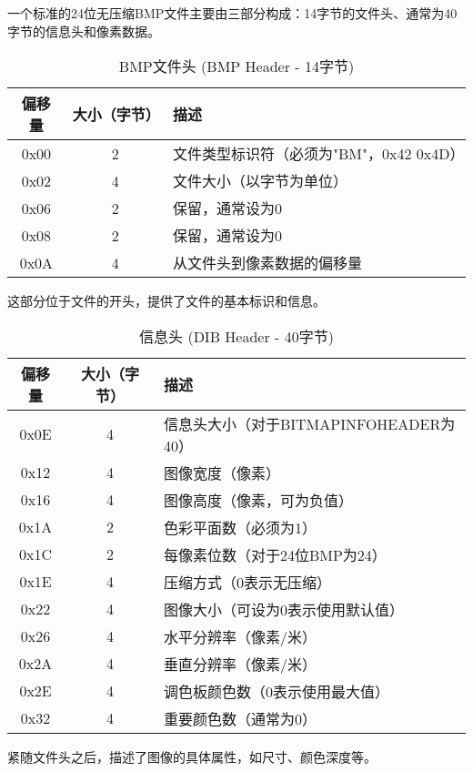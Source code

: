 \documentclass[11pt]{article}
\begin{document}
一个标准的24位无压缩BMP文件主要由三部分构成：14字节的文件头、通常为40字节的信息头和像素数据。
\begin{table}[htbp]
  \centering
  \caption{BMP文件头 (BMP Header - 14字节)}
  \begin{tabular}{|c|c|l|}
    \hline
    \textbf{偏移量} & \textbf{大小（字节）} & \textbf{描述} \\
    \hline
    0x00 & 2 & 文件类型标识符（必须为"BM"，0x42 0x4D） \\
    \hline
    0x02 & 4 & 文件大小（以字节为单位） \\
    \hline
    0x06 & 2 & 保留，通常设为0 \\
    \hline
    0x08 & 2 & 保留，通常设为0 \\
    \hline
    0x0A & 4 & 从文件头到像素数据的偏移量 \\
    \hline
  \end{tabular}
  \label{tab:bmp_header}
\end{table}
这部分位于文件的开头，提供了文件的基本标识和信息。
\begin{table}[htbp]
  \centering
  \caption{信息头 (DIB Header - 40字节)}
  \begin{tabular}{|c|c|l|}
    \hline
    \textbf{偏移量} & \textbf{大小（字节）} & \textbf{描述} \\
    \hline
    0x0E & 4 & 信息头大小（对于BITMAPINFOHEADER为40） \\
    \hline
    0x12 & 4 & 图像宽度（像素） \\
    \hline
    0x16 & 4 & 图像高度（像素，可为负值） \\
    \hline
    0x1A & 2 & 色彩平面数（必须为1） \\
    \hline
    0x1C & 2 & 每像素位数（对于24位BMP为24） \\
    \hline
    0x1E & 4 & 压缩方式（0表示无压缩） \\
    \hline
    0x22 & 4 & 图像大小（可设为0表示使用默认值） \\
    \hline
    0x26 & 4 & 水平分辨率（像素/米） \\
    \hline
    0x2A & 4 & 垂直分辨率（像素/米） \\
    \hline
    0x2E & 4 & 调色板颜色数（0表示使用最大值） \\
    \hline
    0x32 & 4 & 重要颜色数（通常为0） \\
    \hline
  \end{tabular}
  \label{tab:dib_header}
\end{table}
紧随文件头之后，描述了图像的具体属性，如尺寸、颜色深度等。
\end{document}
